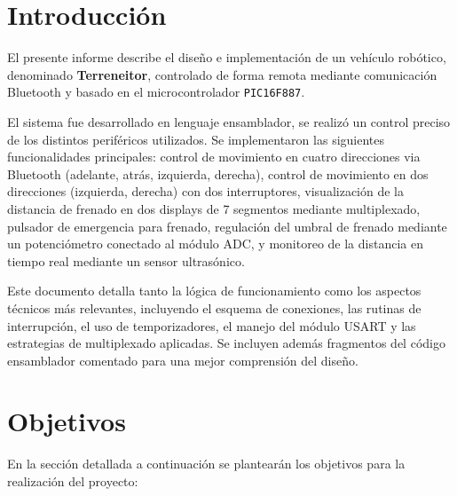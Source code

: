 \documentclass[]{article}
\begin{document}
	\tableofcontents
	
	\newpage
	\thispagestyle{fancy}
	
	\section{Introducción}
	
	El presente informe describe el diseño e implementación de un vehículo robótico, denominado \textbf{Terreneitor}, controlado de forma remota mediante comunicación Bluetooth y basado en el microcontrolador \texttt{PIC16F887}.
	
	El sistema fue desarrollado en lenguaje ensamblador, se realizó un control preciso de los distintos periféricos utilizados. Se implementaron las siguientes funcionalidades principales: control de movimiento en cuatro direcciones via Bluetooth (adelante, atrás, izquierda, derecha), control de movimiento en dos direcciones (izquierda, derecha) con dos interruptores, visualización de la distancia de frenado en dos displays de 7 segmentos mediante multiplexado, pulsador de emergencia para frenado, regulación del umbral de frenado mediante un potenciómetro conectado al módulo ADC, y monitoreo de la distancia en tiempo real mediante un sensor ultrasónico.
	
	Este documento detalla tanto la lógica de funcionamiento como los aspectos técnicos más relevantes, incluyendo el esquema de conexiones, las rutinas de interrupción, el uso de temporizadores, el manejo del módulo USART y las estrategias de multiplexado aplicadas. Se incluyen además fragmentos del código ensamblador comentado para una mejor comprensión del diseño.
	
	\section{Objetivos}
	
	En la sección detallada a continuación se plantearán los objetivos para la realización del proyecto:
	
\end{document}
